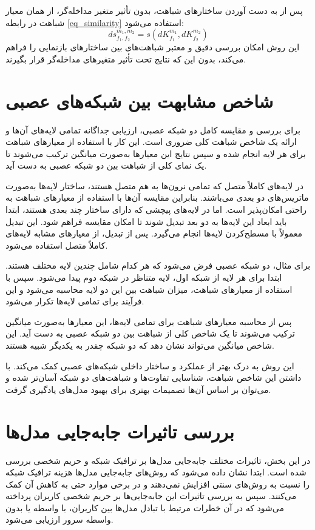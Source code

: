 پس از به دست آوردن ساختارهای شباهت، بدون تأثیر متغیر مداخله‌گر، از همان معیار شباهت در رابطه
\eqref{eq_similarity}
استفاده می‌شود:
\begin{equation}
	ds^{m_1,m_2}_{f_1,f_2} = s(dK^{m_1}_{f_1}, dK^{m_2}_{f_2})
\end{equation}
این روش امکان بررسی دقیق و معتبر شباهت‌های بین ساختارهای بازنمایی را فراهم می‌کند، بدون این که نتایج تحت تأثیر متغیرهای مداخله‌گر قرار بگیرند.



\section{شاخص مشابهت بین شبکه‌های عصبی}
برای بررسی و مقایسه کامل دو شبکه عصبی، ارزیابی جداگانه تمامی لایه‌های آن‌ها و ارائه یک شاخص شباهت کلی ضروری است. این کار با استفاده از معیارهای شباهت برای هر لایه انجام شده و سپس نتایج این معیارها به‌صورت میانگین ترکیب می‌شوند تا یک نمای کلی از شباهت بین دو شبکه عصبی به دست آید.

در لایه‌های کاملاً متصل%
که تمامی نرون‌ها به هم متصل هستند، ساختار لایه‌ها به‌صورت ماتریس‌های دو بعدی می‌باشند. بنابراین مقایسه آن‌ها با استفاده از معیارهای شباهت به راحتی امکان‌پذیر است. اما در لایه‌های پیچشی%
که دارای ساختار چند بعدی هستند، ابتدا باید ابعاد این لایه‌ها به دو بعد تبدیل شوند تا امکان مقایسه فراهم شود. این تبدیل معمولاً با مسطح‌کردن%
لایه‌ها انجام می‌گیرد. پس از تبدیل، از معیارهای مشابه لایه‌های کاملاً متصل استفاده می‌شود.

برای مثال، دو شبکه عصبی فرض می‌شود که هر کدام شامل چندین لایه مختلف هستند. ابتدا برای هر لایه از شبکه اول، لایه متناظر در شبکه دوم پیدا می‌شود. سپس با استفاده از معیارهای شباهت، میزان شباهت بین این دو لایه محاسبه می‌شود و این فرآیند برای تمامی لایه‌ها تکرار می‌شود.

پس از محاسبه معیارهای شباهت برای تمامی لایه‌ها، این معیارها به‌صورت میانگین ترکیب می‌شوند تا یک شاخص کلی از شباهت بین دو شبکه عصبی به دست آید. این شاخص میانگین می‌تواند نشان دهد که دو شبکه چقدر به یکدیگر شبیه هستند.

این روش به درک بهتر از عملکرد و ساختار داخلی شبکه‌های عصبی کمک می‌کند. با داشتن این شاخص شباهت، شناسایی تفاوت‌ها و شباهت‌های دو شبکه آسان‌تر شده و می‌توان بر اساس آن‌ها تصمیمات بهتری برای بهبود مدل‌های یادگیری گرفت.




\section{بررسی تاثیرات جابه‌جایی مدل‌ها}
در این بخش، تاثیرات مختلف جابه‌جایی مدل‌ها بر ترافیک شبکه و حریم شخصی بررسی شده است. ابتدا نشان داده می‌شود که روش‌های جابه‌جایی مدل‌ها هزینه ترافیک شبکه را نسبت به روش‌های سنتی افزایش نمی‌دهند و در برخی موارد حتی به کاهش آن کمک می‌کنند. سپس به بررسی تاثیرات این جابه‌جایی‌ها بر حریم شخصی کاربران پرداخته می‌شود که در آن خطرات مرتبط با تبادل مدل‌ها بین کاربران، با واسطه یا بدون واسطه سرور ارزیابی می‌شود.

